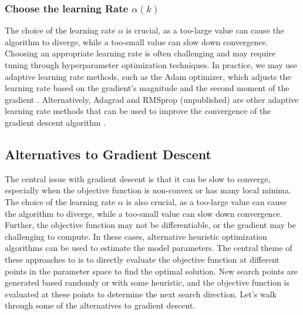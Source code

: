 \documentclass{article}[11pt]
\begin{document}
\subsubsection*{Choose the learning Rate $\alpha(k)$}
The choice of the learning rate $\alpha$ is crucial, as a too-large value can cause the algorithm to diverge, while a too-small value can slow down convergence.
Choosing an appropriate learning rate is often challenging and may require tuning through hyperparameter optimization techniques. 
In practice, we may use adaptive learning rate methods, such as the Adam optimizer, which adjusts the learning rate based on the gradient's magnitude and the second moment of the gradient \cite{ADAM-2014}.
Alternatively, Adagrad and RMSprop (unpublished) are other adaptive learning rate methods that can be used to improve the convergence of the gradient descent algorithm \cite{ADAGrad2011}.

\subsection{Alternatives to Gradient Descent}
The central issue with gradient descent is that it can be slow to converge, especially when the objective function is non-convex or has many local minima.
The choice of the learning rate $\alpha$ is also crucial, as a too-large value can cause the algorithm to diverge, while a too-small value can slow down convergence.
Further, the objective function may not be differentiable, or the gradient may be challenging to compute.
In these cases, alternative heuristic optimization algorithms can be used to estimate the model parameters.
The central theme of these approaches to is to directly evaluate the objective function at different points in the parameter space to find the optimal solution.
New search points are generated based randomly or with some heuristic, and the objective function is evaluated at these points to determine the next search direction.
Let's walk through some of the alternatives to gradient descent.
\end{document}
